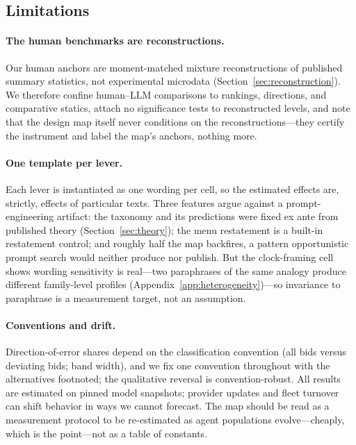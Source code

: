 \subsection{Limitations}\label{sec:discussion-limitations}

\paragraph{The human benchmarks are reconstructions.}
Our human anchors are moment-matched mixture reconstructions of published summary statistics, not experimental microdata (Section~\ref{sec:reconstruction}). We therefore confine human--LLM comparisons to rankings, directions, and comparative statics, attach no significance tests to reconstructed levels, and note that the design map itself never conditions on the reconstructions---they certify the instrument and label the map's anchors, nothing more. 

\paragraph{One template per lever.}
Each lever is instantiated as one wording per cell, so the estimated effects are, strictly, effects of particular texts. Three features argue against a prompt-engineering artifact: the taxonomy and its predictions were fixed ex ante from published theory (Section~\ref{sec:theory}); the menu restatement is a built-in restatement control; and roughly half the map backfires, a pattern opportunistic prompt search would neither produce nor publish. But the clock-framing cell shows wording sensitivity is real---two paraphrases of the same analogy produce different family-level profiles (Appendix~\ref{app:heterogeneity})---so invariance to paraphrase is a measurement target, not an assumption. 

\paragraph{Conventions and drift.}
Direction-of-error shares depend on the classification convention (all bids versus deviating bids; band width), and we fix one convention throughout with the alternatives footnoted; the qualitative reversal is convention-robust. All results are estimated on pinned model snapshots; provider updates and fleet turnover can shift behavior in ways we cannot forecast. The map should be read as a measurement protocol to be re-estimated as agent populations evolve---cheaply, which is the point---not as a table of constants.

